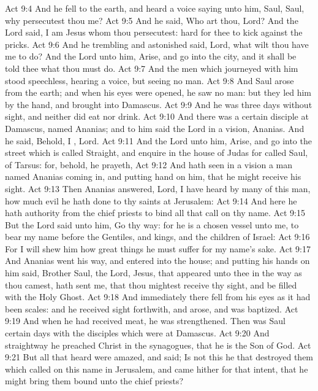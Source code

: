 \vs Act 9:4 And he fell to the earth, and heard a voice saying unto him, Saul, Saul, why persecutest thou me?
\vs Act 9:5 And he said, Who art thou, Lord? And the Lord said, I am Jesus whom thou persecutest:  hard for thee to kick against the pricks.
\vs Act 9:6 And he trembling and astonished said, Lord, what wilt thou have me to do? And the Lord  unto him, Arise, and go into the city, and it shall be told thee what thou must do.
\vs Act 9:7 And the men which journeyed with him stood speechless, hearing a voice, but seeing no man.
\vs Act 9:8 And Saul arose from the earth; and when his eyes were opened, he saw no man: but they led him by the hand, and brought  into Damascus.
\vs Act 9:9 And he was three days without sight, and neither did eat nor drink.
\vs Act 9:10 And there was a certain disciple at Damascus, named Ananias; and to him said the Lord in a vision, Ananias. And he said, Behold, I , Lord.
\vs Act 9:11 And the Lord  unto him, Arise, and go into the street which is called Straight, and enquire in the house of Judas for  called Saul, of Tarsus: for, behold, he prayeth,
\vs Act 9:12 And hath seen in a vision a man named Ananias coming in, and putting  hand on him, that he might receive his sight.
\vs Act 9:13 Then Ananias answered, Lord, I have heard by many of this man, how much evil he hath done to thy saints at Jerusalem:
\vs Act 9:14 And here he hath authority from the chief priests to bind all that call on thy name.
\vs Act 9:15 But the Lord said unto him, Go thy way: for he is a chosen vessel unto me, to bear my name before the Gentiles, and kings, and the children of Israel:
\vs Act 9:16 For I will shew him how great things he must suffer for my name's sake.
\vs Act 9:17 And Ananias went his way, and entered into the house; and putting his hands on him said, Brother Saul, the Lord,  Jesus, that appeared unto thee in the way as thou camest, hath sent me, that thou mightest receive thy sight, and be filled with the Holy Ghost.
\vs Act 9:18 And immediately there fell from his eyes as it had been scales: and he received sight forthwith, and arose, and was baptized.
\vs Act 9:19 And when he had received meat, he was strengthened. Then was Saul certain days with the disciples which were at Damascus.
\vs Act 9:20 And straightway he preached Christ in the synagogues, that he is the Son of God.
\vs Act 9:21 But all that heard  were amazed, and said; Is not this he that destroyed them which called on this name in Jerusalem, and came hither for that intent, that he might bring them bound unto the chief priests?
